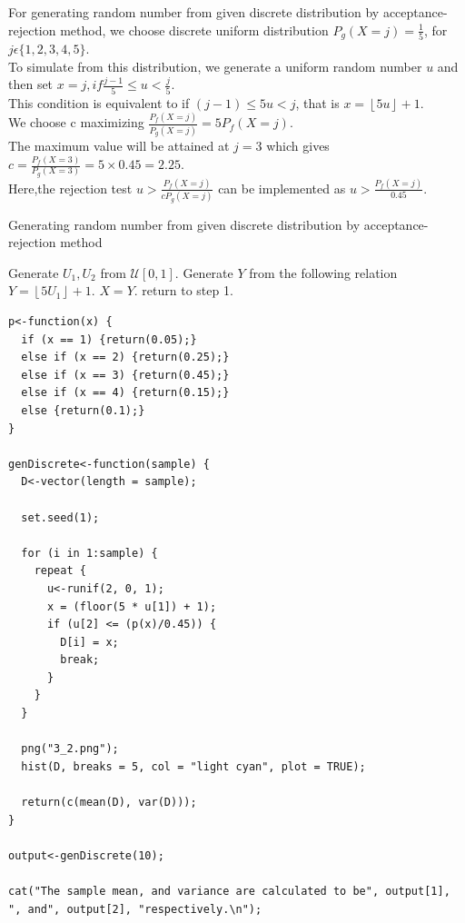 \documentclass[11pt]{article}
\begin{document}
 For generating random number from given discrete distribution by acceptance-rejection method, we choose discrete uniform distribution $P_g(X = j) = \frac{1}{5}$, for $j \epsilon \{1, 2, 3, 4, 5\}$.\\
To simulate from this distribution, we generate a uniform random number $u$ and then set $x = j, if \frac{j - 1}{5} \leq u < \frac{j}{5}$.\\
This condition is equivalent to if $(j - 1) \leq 5u < j$, that is $x = \left \lfloor{5u}\right \rfloor + 1$.\\
We choose c maximizing $\frac{P_f(X = j)}{P_g(X = j)} = 5P_f(X = j)$.\\
The maximum value will be attained at $j = 3$ which gives $c = \frac{P_f(X = 3)}{P_g(X = 3)} = 5\times0.45 = 2.25$.\\
Here,the rejection test $u > \frac{P_f(X = j)}{cP_g(X = j)}$ can be implemented as $u > \frac{P_f(X = j)}{0.45}$.


\begin{algorithm}[H]
\caption{Generating random number from given discrete distribution by acceptance-rejection method}
\begin{algorithmic}[1]
\STATE Generate $U_1, U_2$ from $\mathcal{U}[0,1]$.
\STATE Generate $Y$ from the following relation $Y = \left \lfloor{5U_1}\right \rfloor + 1$.
{}
  \STATE  $X = Y$.
\ELSE
  \STATE  return to step 1.
\ENDIF
\end{algorithmic}
\end{algorithm}

\newpage


\begin{lstlisting}
p<-function(x) {
  if (x == 1) {return(0.05);}
  else if (x == 2) {return(0.25);}
  else if (x == 3) {return(0.45);}
  else if (x == 4) {return(0.15);}
  else {return(0.1);}
}

genDiscrete<-function(sample) {
  D<-vector(length = sample);

  set.seed(1);

  for (i in 1:sample) {
    repeat {
      u<-runif(2, 0, 1);
      x = (floor(5 * u[1]) + 1);
      if (u[2] <= (p(x)/0.45)) {
        D[i] = x;
        break;
      }
    }
  }

  png("3_2.png");
  hist(D, breaks = 5, col = "light cyan", plot = TRUE);

  return(c(mean(D), var(D)));
}

output<-genDiscrete(10);

cat("The sample mean, and variance are calculated to be", output[1], ", and", output[2], "respectively.\n");

\end{lstlisting}
\newpage
{}
\end{document}
